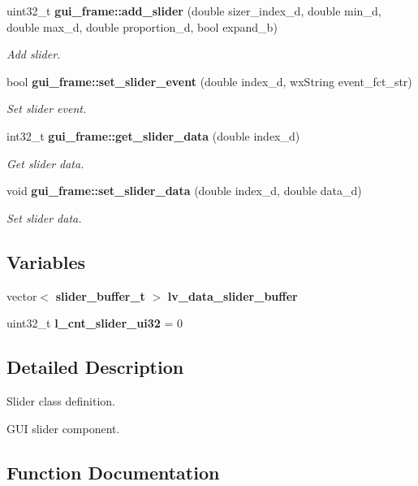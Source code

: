 \begin{DoxyCompactItemize}
uint32\+\_\+t \textbf{ gui\+\_\+frame\+::add\+\_\+slider} (double sizer\+\_\+index\+\_\+d, double min\+\_\+d, double max\+\_\+d, double proportion\+\_\+d, bool expand\+\_\+b)
\begin{DoxyCompactList}\small\item\em Add slider. \end{DoxyCompactList}\item 
bool \textbf{ gui\+\_\+frame\+::set\+\_\+slider\+\_\+event} (double index\+\_\+d, wx\+String event\+\_\+fct\+\_\+str)
\begin{DoxyCompactList}\small\item\em Set slider event. \end{DoxyCompactList}\item 
int32\+\_\+t \textbf{ gui\+\_\+frame\+::get\+\_\+slider\+\_\+data} (double index\+\_\+d)
\begin{DoxyCompactList}\small\item\em Get slider data. \end{DoxyCompactList}\item 
void \textbf{ gui\+\_\+frame\+::set\+\_\+slider\+\_\+data} (double index\+\_\+d, double data\+\_\+d)
\begin{DoxyCompactList}\small\item\em Set slider data. \end{DoxyCompactList}\end{DoxyCompactItemize}
\subsection*{Variables}
\begin{DoxyCompactItemize}
\item 
vector$<$ \textbf{ slider\+\_\+buffer\+\_\+t} $>$ \textbf{ lv\+\_\+data\+\_\+slider\+\_\+buffer}
\item 
\mbox{\label{group___slider_ga7ff3e56a02278a8a9dc76e2674a0beb9}} 
uint32\+\_\+t {\bfseries l\+\_\+cnt\+\_\+slider\+\_\+ui32} = 0
\end{DoxyCompactItemize}


\subsection{Detailed Description}
Slider class definition. 

G\+UI slider component.

\subsection{Function Documentation}
\mbox{\label{group___slider_ga1b23f610ea0da81cb63de2912076f128}} 
